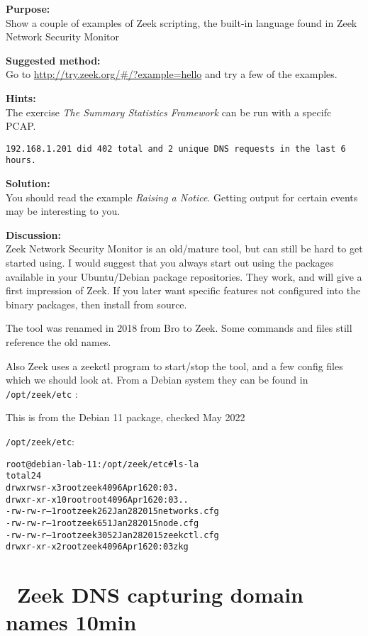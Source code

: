 \documentclass[a4paper,11pt,notitlepage]{report}
\begin{document}
{\bf Purpose:}\\
Show a couple of examples of Zeek scripting, the built-in language found in Zeek Network Security Monitor


{\bf Suggested method:}\\
Go to \url{http://try.zeek.org/#/?example=hello} and try a few of the examples.

{\bf Hints:}\\
The exercise
\emph{The Summary Statistics Framework} can be run with a specifc PCAP.

\verb+192.168.1.201 did 402 total and 2 unique DNS requests in the last 6 hours.+

{\bf Solution:}\\
You should read the example \emph{Raising a Notice}. Getting output for certain events may be interesting to you.


{\bf Discussion:}\\
Zeek Network Security Monitor is an old/mature tool, but can still be hard to get started using. I would suggest that you always start out using the packages available in your Ubuntu/Debian package repositories.  They work, and will give a first impression of Zeek. If you later want specific features not configured into the binary packages, then install from source.

The tool was renamed in 2018 from Bro to Zeek. Some commands and files still reference the old names.

Also Zeek uses a zeekctl program to start/stop the tool, and a few config files which we should look at. From a Debian system they can be found in \verb+/opt/zeek/etc+ :

This is from the Debian 11 package, checked May 2022

\verb+/opt/zeek/etc+:
\begin{alltt}
root@debian-lab-11:/opt/zeek/etc# ls -la
total 24
drwxrwsr-x  3 root zeek 4096 Apr 16 20:03 .
drwxr-xr-x 10 root root 4096 Apr 16 20:03 ..
-rw-rw-r--  1 root zeek  262 Jan 28  2015 networks.cfg
-rw-rw-r--  1 root zeek  651 Jan 28  2015 node.cfg
-rw-rw-r--  1 root zeek 3052 Jan 28  2015 zeekctl.cfg
drwxr-xr-x  2 root zeek 4096 Apr 16 20:03 zkg
\end{alltt}

\chapter{\faExclamationTriangle\ Zeek DNS capturing domain names 10min}
\label{ex:zeekdnsbasic}
\end{document}
